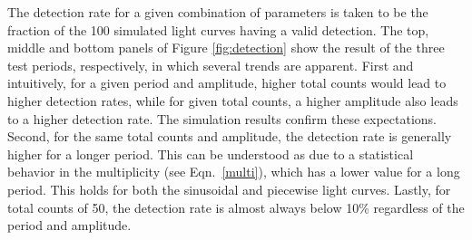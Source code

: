 \documentclass[fleqn,usenatbib]{mnras}
\begin{document}
The detection rate for a given combination of parameters is taken to be the fraction of the 100 simulated light curves having a valid detection. The top, middle and bottom panels of Figure \ref{fig:detection} show the result of the three test periods, respectively, in which several trends are apparent. 
First and intuitively, for a given period and amplitude, higher total counts would lead to higher detection rates, while for given total counts, a higher amplitude also leads to a higher detection rate. The simulation results confirm these expectations.  
Second, for the same total counts and amplitude, the detection rate is generally higher for a longer period.  
This can be understood as due to a statistical behavior in the 
multiplicity (see Eqn.~\ref{multi}), which has a lower value for a long period. This holds for both the sinusoidal and piecewise light curves. 
Lastly, for total counts of 50, the detection rate is almost always below 10\% regardless of the period and amplitude. 
 
\end{document}
